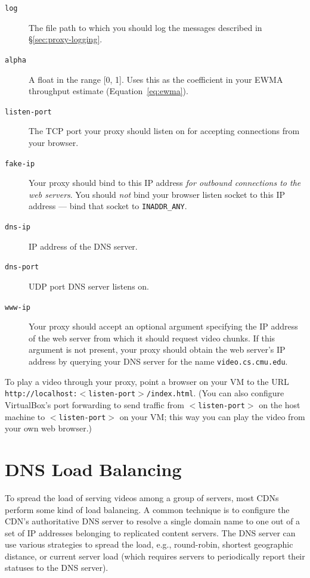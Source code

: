 \documentclass{article}
\newcommand{\theurl}{\texttt{video.cs.cmu.edu}}
\begin{document}
\begin{description}
	\item[\texttt{log}] The file path to which you should log the messages
	described in \S\ref{sec:proxy-logging}.
	\item[\texttt{alpha}] A float in the range [0, 1]. Uses this as the
	coefficient in your EWMA throughput estimate (Equation~\ref{eq:ewma}).
	\item[\texttt{listen-port}] The TCP port your proxy should listen on for
	accepting connections from your browser.
	\item[\texttt{fake-ip}] Your proxy should bind to this IP address \emph{for
	outbound connections to the web servers}. You should \emph{not} bind your
	browser listen socket to this IP address --- bind that socket to
	\texttt{INADDR\_ANY}.
	\item[\texttt{dns-ip}] IP address of the DNS server.
	\item[\texttt{dns-port}] UDP port DNS server listens on.
	\item[\texttt{www-ip}] Your proxy should accept an optional argument
	specifying the IP address of the web server from which it should request
	video chunks. If this argument is not present, your proxy should obtain the
	web server's IP address by querying your DNS server for the name \theurl.
\end{description}

To play a video through your proxy, point a browser on your VM to the URL\\
\texttt{http://localhost:$<$listen-port$>$/index.html}. (You can also configure
VirtualBox's port forwarding to send traffic from \texttt{$<$listen-port$>$} on
the host machine to \texttt{$<$listen-port$>$} on your VM; this way you can
play the video from your own web browser.)





\section{DNS Load Balancing}
\label{sec:dns}

To spread the load of serving videos among a group of servers, most CDNs
perform some kind of load balancing. A common technique is to configure the
CDN's authoritative DNS server to resolve a single domain name to one out of a
set of IP addresses belonging to replicated content servers. The DNS server can
use various strategies to spread the load, e.g., round-robin, shortest
geographic distance, or current server load (which requires servers to
periodically report their statuses to the DNS server).
\end{document}
